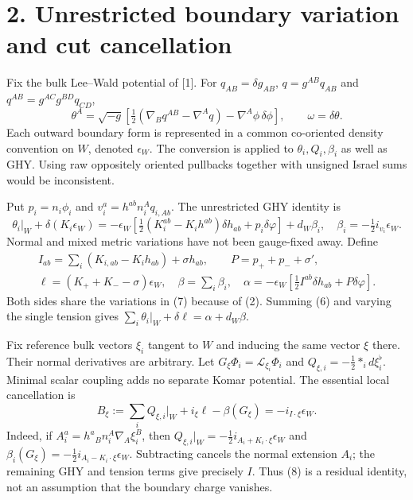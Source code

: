 \documentclass[
  10pt,
]{article}
\begin{document}
\section{2. Unrestricted boundary variation and cut
cancellation}\label{unrestricted-boundary-variation-and-cut-cancellation}

Fix the bulk Lee--Wald potential of {[}1{]}. For
\(q_{AB}=\delta g_{AB}\), \(q=g^{AB}q_{AB}\) and
\(q^{AB}=g^{AC}g^{BD}q_{CD}\), \[
 \theta^A=\sqrt{-g}\left[
 \tfrac12(\nabla_Bq^{AB}-\nabla^Aq)-\nabla^A\phi\,\delta\phi\right],
 \qquad \omega=\delta\theta .                            \tag{5}
\] Each outward boundary form is represented in a common co-oriented
density convention on \(W\), denoted \(\epsilon_W\). The conversion is
applied to \(\theta_i,Q_i,\beta_i\) as well as GHY. Using raw oppositely
oriented pullbacks together with unsigned Israel sums would be
inconsistent.

Put \(p_i=n_i\phi_i\) and \(v_i^a=h^{ab}n_i^Aq_{i,Ab}\). The
unrestricted GHY identity is \[
 \theta_i|_W+\delta(K_i\epsilon_W)
 =-\epsilon_W\left[\tfrac12(K_i^{ab}-K_ih^{ab})\delta h_{ab}
                 +p_i\delta\varphi\right]+d_W\beta_i,
 \quad \beta_i=-\tfrac12 i_{v_i}\epsilon_W.               \tag{6}
\] Normal and mixed metric variations have not been gauge-fixed away.
Define \[
 \begin{gathered}
 I_{ab}=\sum_i(K_{i,ab}-K_i h_{ab})+\sigma h_{ab},\qquad
 P=p_++p_-+\sigma',\\
 \ell=(K_++K_--\sigma)\epsilon_W,\quad\beta=\sum_i\beta_i,
 \quad\alpha=-\epsilon_W[\tfrac12I^{ab}\delta h_{ab}+P\delta\varphi].
 \end{gathered}                                           \tag{7}
\] Both sides share the variations in (7) because of (2). Summing (6)
and varying the single tension gives \(\sum_i\theta_i|_W+\delta\ell
=\alpha+d_W\beta\).

Fix reference bulk vectors \(\xi_i\) tangent to \(W\) and inducing the
same vector \(\xi\) there. Their normal derivatives are arbitrary. Let
\(G_\xi\Phi_i=\mathcal L_{\xi_i}\Phi_i\) and
\(Q_{\xi,i}=-\tfrac12*_i d\xi_i^\flat\). Minimal scalar coupling adds no
separate Komar potential. The essential local cancellation is \[
 B_\xi:=\sum_iQ_{\xi,i}|_W+i_\xi\ell-\beta(G_\xi)
       =-i_{I\cdot\xi}\epsilon_W .                       \tag{8}
\] Indeed, if \(A_i^a=h^a{}_B n_i^A\nabla_A\xi_i^B\), then
\(Q_{\xi,i}|_W=-\tfrac12i_{A_i+K_i\cdot\xi}\epsilon_W\) and
\(\beta_i(G_\xi)=-\tfrac12i_{A_i-K_i\cdot\xi}\epsilon_W\). Subtracting
cancels the normal extension \(A_i\); the remaining GHY and tension
terms give precisely \(I\). Thus (8) is a residual identity, not an
assumption that the boundary charge vanishes.
\end{document}
